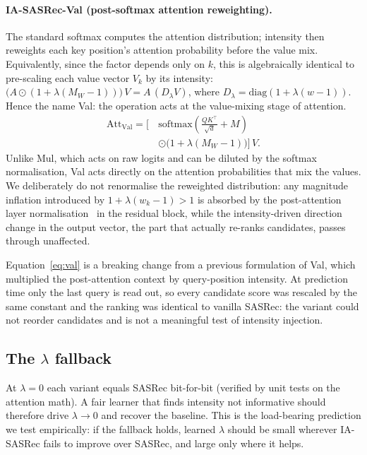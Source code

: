 \paragraph{IA-SASRec-Val (post-softmax attention reweighting).}
The standard softmax computes the attention distribution; intensity then
reweights each key position's attention probability before the value
mix. Equivalently, since the factor depends only on $k$, this is
algebraically identical to pre-scaling each value vector $V_k$ by its
intensity: $\big(A \odot (1{+}\lambda(M_W{-}1))\big)\,V = A\,(D_\lambda V)$,
where $D_\lambda = \mathrm{diag}(1{+}\lambda(w{-}1))$. Hence the name
Val: the operation acts at the value-mixing stage of attention.
\begin{equation}
\begin{aligned}
\mathrm{Att}_{\mathrm{Val}} = \bigl[\,
  & \mathrm{softmax}\!\left(\tfrac{QK^{\top}}{\sqrt{d}} + M\right) \\
  & \odot \bigl(1 + \lambda(M_W - 1)\bigr) \bigr]\, V.
\end{aligned}
\label{eq:val}
\end{equation}
Unlike Mul, which acts on raw logits and can be diluted by the
softmax normalisation, Val acts directly on the attention
probabilities that mix the values. We deliberately do not renormalise
the reweighted distribution: any magnitude inflation introduced by
$1{+}\lambda(w_k{-}1) > 1$ is absorbed by the post-attention layer
normalisation~\citep{ba2016layernorm} in the residual block, while the
intensity-driven direction change in the output vector, the
part that actually re-ranks candidates, passes through unaffected.

Equation~\eqref{eq:val} is a breaking change from a previous formulation
of Val, which multiplied the post-attention context by
query-position intensity. At prediction time only the last query is
read out, so every candidate score was rescaled by the same constant
and the ranking was identical to vanilla SASRec: the variant could
not reorder candidates and is not a meaningful test of intensity
injection.

\subsection{The $\lambda$ fallback}
\label{sec:method:escape}

At $\lambda = 0$ each variant equals SASRec bit-for-bit (verified by
unit tests on the attention math). A fair learner that finds intensity
not informative should therefore drive $\lambda \to 0$ and recover the
baseline. This is the load-bearing prediction we test empirically: if
the fallback holds, learned $\lambda$
should be small wherever IA-SASRec fails to improve over SASRec, and
large only where it helps.

